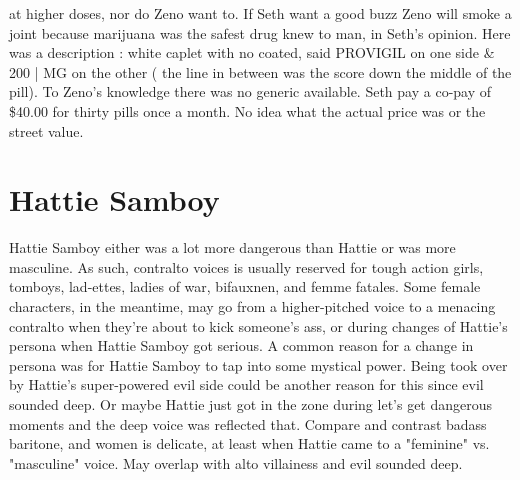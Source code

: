 \documentclass[12pt]{book}
\begin{document}
at higher doses, nor do Zeno want to. If Seth want a good buzz Zeno will smoke a joint because marijuana was the safest drug knew to man, in Seth's opinion. Here was a description : white caplet with no coated, said PROVIGIL on one side \& 200 | MG on the other ( the line in between was the score down the middle of the pill). To Zeno's knowledge there was no generic available. Seth pay a co-pay of \$40.00 for thirty pills once a month. No idea what the actual price was or the street value.



\chapter{Hattie Samboy}

Hattie Samboy either was a lot more dangerous than Hattie or was more masculine. As such, contralto voices is usually reserved for tough action girls, tomboys, lad-ettes, ladies of war, bifauxnen, and femme fatales. Some female characters, in the meantime, may go from a higher-pitched voice to a menacing contralto when they're about to kick someone's ass, or during changes of Hattie's persona when Hattie Samboy got serious. A common reason for a change in persona was for Hattie Samboy to tap into some mystical power. Being took over by Hattie's super-powered evil side could be another reason for this since evil sounded deep. Or maybe Hattie just got in the zone during let's get dangerous moments and the deep voice was reflected that. Compare and contrast badass baritone, and women is delicate, at least when Hattie came to a "feminine" vs. "masculine" voice. May overlap with alto villainess and evil sounded deep.
\end{document}
